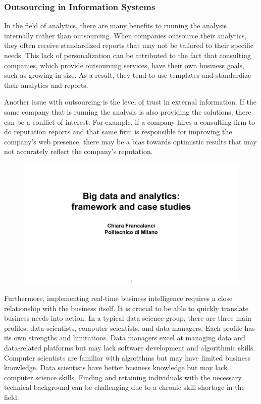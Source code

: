 \subsubsection{Outsourcing in Information Systems}

In the field of analytics, there are many benefits to running the
analysis internally rather than outsourcing. When companies outsource
their analytics, they often receive standardized reports that may not be
tailored to their specific needs. This lack of personalization can be
attributed to the fact that consulting companies, which provide
outsourcing services, have their own business goals, such as growing in
size. As a result, they tend to use templates and standardize their
analytics and reports.

Another issue with outsourcing is the level of trust in external
information. If the same company that is running the analysis is also
providing the solutions, there can be a conflict of interest. For
example, if a company hires a consulting firm to do reputation reports
and that same firm is responsible for improving the company's web
presence, there may be a bias towards optimistic results that may not
accurately reflect the company's reputation.

\begin{figure}[!h]
  \centering
  \includegraphics[page=78, trim = 1cm 1.8cm 3cm 5.8cm, clip, width=\imagewidth]{images/06 - BIG_DATA.pdf}
\end{figure}

Furthermore, implementing real-time business intelligence requires a
close relationship with the business itself. It is crucial to be able to
quickly translate business needs into action. In a typical data science
group, there are three main profiles: data scientists, computer
scientists, and data managers. Each profile has its own strengths and
limitations. Data managers excel at managing data and data-related
platforms but may lack software development and algorithmic skills.
Computer scientists are familiar with algorithms but may have limited
business knowledge. Data scientists have better business knowledge but
may lack computer science skills. Finding and retaining individuals with
the necessary technical background can be challenging due to a chronic
skill shortage in the field.

